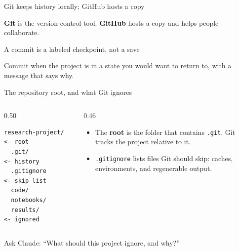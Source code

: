 \begin{frame}{Git keeps history locally; GitHub hosts a copy}
  \vfill
  \begin{center}
    \resizebox{0.94\linewidth}{!}{}
  \end{center}
  \vspace{0.9em}
  \begin{center}\small
    \textbf{Git} is the version-control tool. \textbf{GitHub} hosts a copy and helps people collaborate.
  \end{center}
  \vspace{1.6cm plus 1fill}
\end{frame}
\begin{frame}{A commit is a labeled checkpoint, not a save}
  \vfill
  \begin{center}
    \resizebox{0.94\linewidth}{!}{}
  \end{center}
  \vspace{0.9em}
  \begin{center}\small
    Commit when the project is in a state you would want to return to, with a message that says why.
  \end{center}
  \vspace{1.6cm plus 1fill}
\end{frame}
\begin{frame}[fragile]{The repository root, and what Git ignores}
  \vfill
  \begin{columns}[c]
    \begin{column}{0.50\textwidth}
      \begin{lstlisting}[basicstyle=\ttfamily\footnotesize]
research-project/  <- root
  .git/            <- history
  .gitignore       <- skip list
  code/
  notebooks/
  results/         <- ignored
      \end{lstlisting}
    \end{column}
    \begin{column}{0.46\textwidth}
      \begin{itemize}\setlength\itemsep{0.8em}
        \item The \textbf{root} is the folder that contains \texttt{.git}. Git tracks the project relative to it.
        \item \texttt{.gitignore} lists files Git should skip: caches, environments, and regenerable output.
      \end{itemize}
    \end{column}
  \end{columns}
  \vspace{0.9em}
  \begin{center}\small
    Ask Claude: ``What should this project ignore, and why?''
  \end{center}
  \vspace{1.4cm plus 1fill}
\end{frame}
